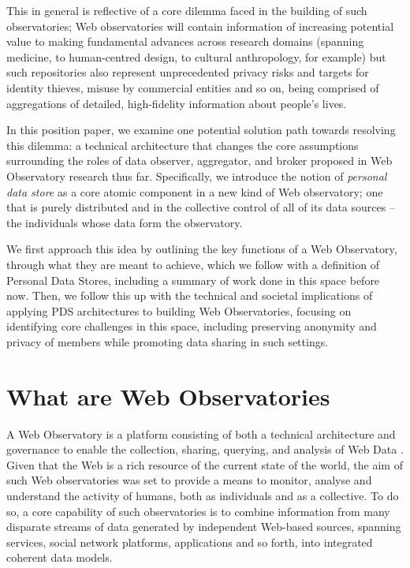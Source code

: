 \documentclass{acm_proc_article-sp}
\begin{document}
This in general is reflective of a core dilemma faced in the building of such observatories; Web observatories will contain information of increasing potential value to making fundamental advances across research domains (spanning medicine, to human-centred design, to cultural anthropology, for example) but such repositories also represent unprecedented privacy risks and targets for identity thieves, misuse by commercial entities and so on, being comprised of aggregations of detailed, high-fidelity information about people's lives. 

In this position paper, we examine one potential solution path towards resolving this dilemma: a technical architecture that changes the core assumptions surrounding the roles of data observer, aggregator, and broker proposed in Web Observatory research thus far. Specifically, we introduce the notion of \emph{personal data store} as a core atomic component in a new kind of Web observatory; one that is purely distributed and in the collective control of all of its data sources -- the individuals whose data form the observatory. 

We first approach this idea by outlining the key functions of a Web Observatory, through what they are meant to achieve, which we follow with a definition of Personal Data Stores, including a summary of work done in this space before now. Then, we follow this up with the technical and societal implications of applying PDS architectures to building Web Observatories, focusing on identifying core challenges in this space, including preserving anonymity and privacy of members while promoting data sharing in such settings.



\section{What are Web Observatories}
A Web Observatory is a platform consisting of both a technical architecture and governance to enable the collection, sharing, querying, and analysis of Web Data \cite{Hall2013, Tiropanis2013}. Given that the Web is a rich resource of the current state of the world, the aim of such Web observatories was set to provide a means to monitor, analyse and understand the activity of humans, both as individuals and as a collective. To do so, a core capability of such observatories is to combine information from many disparate streams of data generated by independent Web-based sources, spanning services, social network platforms, applications and so forth, into integrated coherent data models.
 
\end{document}
